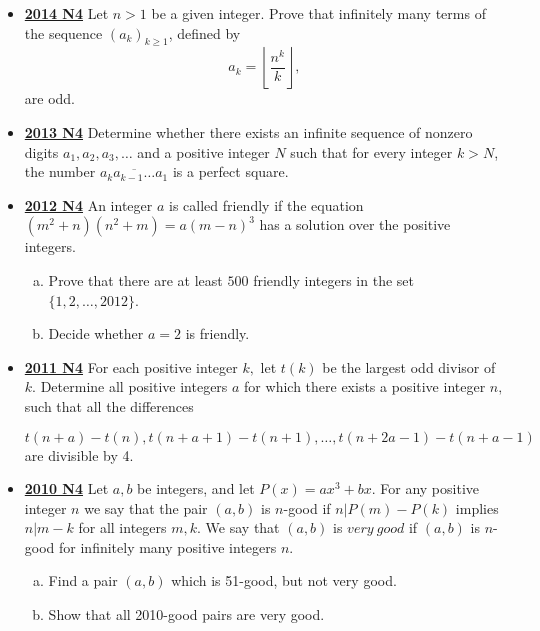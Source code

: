 \documentclass[11pt]{scrartcl}
\begin{document}
\begin{itemize}[leftmargin=*]
\item \href{https://artofproblemsolving.com/community/c6h1113198p5083569}{\textbf{2014 N4}} 	Let $n > 1$ be a given integer. Prove that infinitely many terms of the sequence $(a_k )_{k\geqslant  1}$, defined by\[a_k=\left\lfloor\frac{n^k}{k}\right\rfloor,\]are odd.
\item \href{https://artofproblemsolving.com/community/c6h597246p3544103}{\textbf{2013 N4}} Determine whether there exists an infinite sequence of nonzero digits $a_1 , a_2 , a_3 , \dots $ and a positive integer $N$ such that for every integer $k > N$, the number $\overline{a_k a_{k-1}\dots a_1 }$ is a perfect square.
\item \href{https://artofproblemsolving.com/community/c6h546190p3160606}{\textbf{2012 N4}} An integer $a$ is called friendly if the equation $(m^2+n)(n^2+m)=a(m-n)^3$ has a solution over the positive integers.
\begin{enumerate}[(a)]
    \item Prove that there are at least $500$ friendly integers in the set $\{ 1,2,\dots ,2012\}$.
    \item Decide whether $a=2$ is friendly.
\end{enumerate}

\item \href{https://artofproblemsolving.com/community/c6h488542p2737653}{\textbf{2011 N4}} For each positive integer $k,$ let $t(k)$ be the largest odd divisor of $k.$ Determine all positive integers $a$ for which there exists a positive integer $n,$ such that all the differences

\[t(n+a)-t(n), t(n+a+1)-t(n+1), \dots, t(n+2a-1)-t(n+a-1)\]are divisible by 4.
\item \href{https://artofproblemsolving.com/community/c6h418642p2362008}{\textbf{2010 N4}} Let $a, b$ be integers, and let $P(x) = ax^3+bx.$ For any positive integer $n$ we say that the pair $(a,b)$ is $n$-good if $n | P(m)-P(k)$ implies $n | m - k$ for all integers $m, k.$ We say that $(a,b)$ is $very \ good$ if $(a,b)$ is $n$-good for infinitely many positive integers $n$.

\begin{enumerate}[(a)]
    \item Find a pair $(a,b)$ which is 51-good, but not very good.
    \item Show that all 2010-good pairs are very good.
\end{enumerate}

\newpage


\end{itemize}
\end{document}
